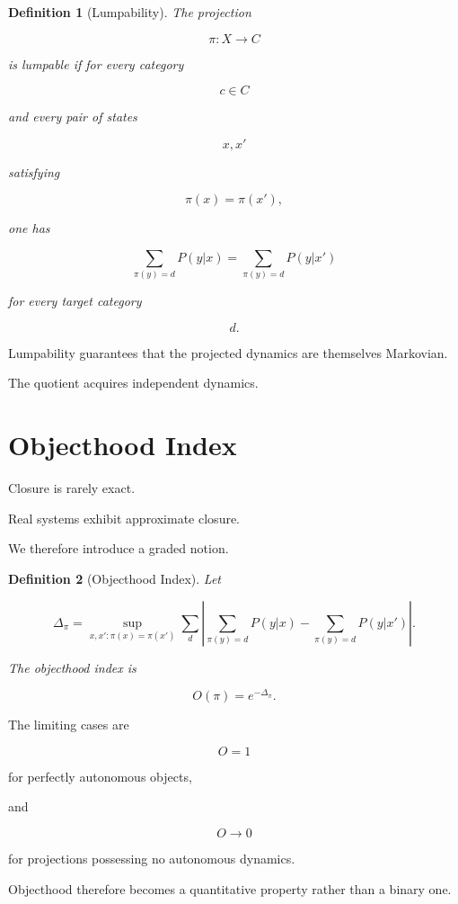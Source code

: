 \documentclass[11pt,oneside,openany]{book}
\newtheorem{definition}{Definition}[chapter] \newtheorem{theorem}{Theorem}[chapter] \newtheorem{proposition}{Proposition}[chapter] \newtheorem{lemma}{Lemma}[chapter] \newtheorem{corollary}{Corollary}[chapter] \newtheorem{remark}{Remark}[chapter]
\begin{document}
\begin{definition}[Lumpability]

The projection

\[
\pi:X\rightarrow C
\]

is lumpable if for every category

\[
c\in C
\]

and every pair of states

\[
x,x'
\]

satisfying

\[
\pi(x)=\pi(x'),
\]

one has

\[
\sum_{\pi(y)=d}
P(y|x)
=
\sum_{\pi(y)=d}
P(y|x')
\]

for every target category

\[
d.
\]

\end{definition}

Lumpability guarantees that the projected dynamics are themselves Markovian.

The quotient acquires independent dynamics.

\section{Objecthood Index}

Closure is rarely exact.

Real systems exhibit approximate closure.

We therefore introduce a graded notion.

\begin{definition}[Objecthood Index]

Let

\[
\Delta_\pi
=
\sup_{x,x':\pi(x)=\pi(x')}
\sum_d
\left|
\sum_{\pi(y)=d}P(y|x)
-
\sum_{\pi(y)=d}P(y|x')
\right|.
\]

The objecthood index is

\[
O(\pi)
=
e^{-\Delta_\pi}.
\]

\end{definition}

The limiting cases are

\[
O=1
\]

for perfectly autonomous objects,

and

\[
O\rightarrow0
\]

for projections possessing no autonomous dynamics.

Objecthood therefore becomes a quantitative property rather than a binary one.
\end{document}
